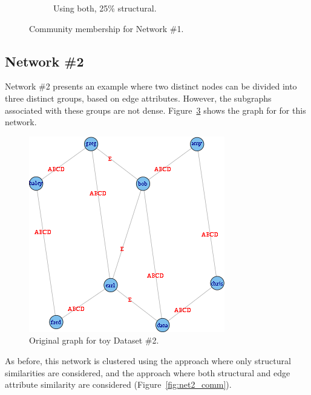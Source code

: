 \documentclass{report} %
\begin{document}
\begin{figure}[htp!]
\begin{subfigure}{.6\textwidth}
    \caption{Using both, 25\% structural.}
    \label{fig:net1_member_both}
  \end{subfigure}
  \caption{Community membership for Network \#1.}
  \label{fig:net1_member}
\end{figure}



\newpage

\subsection*{Network \#2}

Network \#2 presents an example where two distinct nodes can be divided into three distinct groups, based on edge attributes. However, the subgraphs associated with these groups are not dense. Figure~\ref{fig:net2_orig} shows the graph for for this network.

\begin{figure}[htp!]
  \centering
  \includegraphics[width=0.5\linewidth]{toy3/orig.png}
  \caption{Original graph for toy Dataset \#2.}
  \label{fig:net2_orig}
\end{figure}

As before, this network is clustered using the approach where only structural similarities are considered, and the approach where both structural and edge attribute similarity are considered (Figure~\ref{fig:net2_comm}).\\
\end{document}
